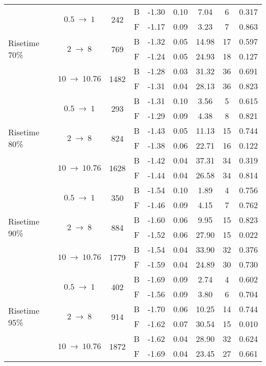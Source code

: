 \begin{table}
\begin{tabular}{l  c  c  c  r@{$~\pm~$}l  c  c  c }
				\multirow{6}{*}{Risetime 70\%}& \multirow{2}{*}{$0.5~\to~1$} & \multirow{2}{*}{242}	& B & -1.30 & 0.10 & 7.04 & 6 & 0.317\\
					& & & F & -1.17 & 0.09 & 3.23 & 7 & 0.863\\
				& \multirow{2}{*}{$2~\to~8$} & \multirow{2}{*}{769}	& B & -1.32 & 0.05 & 14.98 & 17 & 0.597\\
					& & & F & -1.24 & 0.05 & 24.93 & 18 & 0.127\\
				& \multirow{2}{*}{$10~\to~10.76$} & \multirow{2}{*}{1482}	& B & -1.28 & 0.03 & 31.32 & 36 & 0.691\\
					& & & F & -1.31 & 0.04 & 28.13 & 36 & 0.823\\
				\hline
				
				\multirow{6}{*}{Risetime 80\%}& \multirow{2}{*}{$0.5~\to~1$} & \multirow{2}{*}{293}	& B & -1.31 & 0.10 & 3.56 & 5 & 0.615\\
					& & & F & -1.29 & 0.09 & 4.38 & 8 & 0.821\\
				& \multirow{2}{*}{$2~\to~8$} & \multirow{2}{*}{824}	& B & -1.43 & 0.05 & 11.13 & 15 & 0.744\\
					& & & F & -1.38 & 0.06 & 22.71 & 16 & 0.122\\
				& \multirow{2}{*}{$10~\to~10.76$} & \multirow{2}{*}{1628}	& B & -1.42 & 0.04 & 37.31 & 34 & 0.319\\
					& & & F & -1.44 & 0.04 & 26.58 & 34 & 0.814\\
				\hline
				
				\multirow{6}{*}{Risetime 90\%}& \multirow{2}{*}{$0.5~\to~1$} & \multirow{2}{*}{350}	& B & -1.54 & 0.10 & 1.89 & 4 & 0.756\\
					& & & F & -1.46 & 0.09 & 4.15 & 7 & 0.762\\
				& \multirow{2}{*}{$2~\to~8$} & \multirow{2}{*}{884}	& B & -1.60 & 0.06 & 9.95 & 15 & 0.823\\
					& & & F & -1.52 & 0.06 & 27.90 & 15 & 0.022\\
				& \multirow{2}{*}{$10~\to~10.76$} & \multirow{2}{*}{1779}	& B & -1.54 & 0.04 & 33.90 & 32 & 0.376\\
					& & & F & -1.59 & 0.04 & 24.89 & 30 & 0.730\\
				\hline
				
				\multirow{6}{*}{Risetime 95\%}& \multirow{2}{*}{$0.5~\to~1$} & \multirow{2}{*}{402}	& B & -1.69 & 0.09 & 2.74 & 4 & 0.602\\
					& & & F & -1.56 & 0.09 & 3.80 & 6 & 0.704\\
				& \multirow{2}{*}{$2~\to~8$} & \multirow{2}{*}{914}	& B & -1.70 & 0.06 & 10.25 & 14 & 0.744\\
					& & & F & -1.62 & 0.07 & 30.54 & 15 & 0.010\\
				& \multirow{2}{*}{$10~\to~10.76$} & \multirow{2}{*}{1872}	& B & -1.62 & 0.04 & 28.90 & 32 & 0.624\\
					& & & F & -1.69 & 0.04 & 23.45 & 27 & 0.661\\
				\hline
				

\end{tabular}
\end{table}
